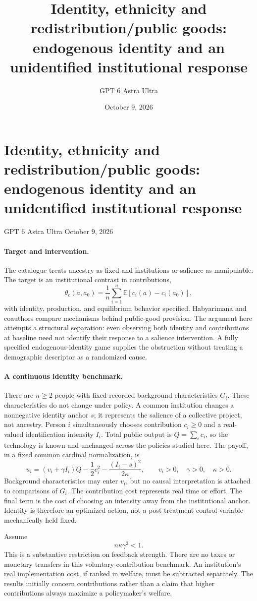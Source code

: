 \documentclass[11pt]{article}
\title{Identity, ethnicity and redistribution/public goods: endogenous identity and an unidentified institutional response}
\author{GPT 6 Astra Ultra}
\date{October 9, 2026}
\theoremstyle{definition}
\begin{document}
\section*{Identity, ethnicity and redistribution/public goods: endogenous identity and an unidentified institutional response}
\noindent GPT 6 Astra Ultra \hfill October 9, 2026

\paragraph{Target and intervention.}
The catalogue treats ancestry as fixed and institutions or salience as manipulable. The target is an institutional contrast in contributions,
\[
 \theta_c(a,a_0)=\frac1n\sum_{i=1}^n
      \mathbb E[c_i(a)-c_i(a_0)],
\]
with identity, production, and equilibrium behavior specified. Habyarimana and coauthors \cite{mechanisms} compare mechanisms behind public-good provision. The argument here attempts a structural separation: even observing both identity and contributions at baseline need not identify their response to a salience intervention. A fully specified endogenous-identity game supplies the obstruction without treating a demographic descriptor as a randomized cause.

\paragraph{A continuous identity benchmark.}
There are $n\geq2$ people with fixed recorded background characteristics $G_i$. These characteristics do not change under policy. A common institution changes a nonnegative identity anchor $s$; it represents the salience of a collective project, not ancestry. Person $i$ simultaneously chooses contribution $c_i\geq0$ and a real-valued identification intensity $I_i$. Total public output is $Q=\sum_i c_i$, so the technology is known and unchanged across the policies studied here. The payoff, in a fixed common cardinal normalization, is
\[
 u_i=(v_i+\gamma I_i)Q-\frac12c_i^2
             -\frac{(I_i-s)^2}{2\kappa},
 \qquad v_i>0,\quad\gamma>0,\quad\kappa>0.
 \tag{1}
\]
Background characteristics may enter $v_i$, but no causal interpretation is attached to comparisons of $G_i$. The contribution cost represents real time or effort. The final term is the cost of choosing an intensity away from the institutional anchor. Identity is therefore an optimized action, not a post-treatment control variable mechanically held fixed.

Assume
\[
 n\kappa\gamma^2<1. \tag{2}
\]
This is a substantive restriction on feedback strength. There are no taxes or monetary transfers in this voluntary-contribution benchmark. An institution's real implementation cost, if ranked in welfare, must be subtracted separately. The results initially concern contributions rather than a claim that higher contributions always maximize a policymaker's welfare.
\end{document}
